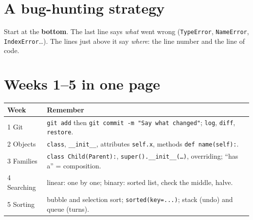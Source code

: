\section{A bug-hunting strategy}
\begin{center}
\end{center}

\begin{tip}
Start at the \textbf{bottom}. The last line says \emph{what} went wrong (\texttt{TypeError}, \texttt{NameError}, \texttt{IndexError}\ldots). The lines just above it say \emph{where}: the line number and the line of code.
\end{tip}

\section{Weeks 1--5 in one page}
\begin{center}
\renewcommand{\arraystretch}{1.25}
\begin{tabular}{@{}p{3cm}p{10.3cm}@{}}
\toprule
\textbf{Week} & \textbf{Remember} \\ \midrule
1 Git & \texttt{git add} then \texttt{git commit -m "Say what changed"}; \texttt{log}, \texttt{diff}, \texttt{restore}. \\
2 Objects & \texttt{class}, \texttt{\_\_init\_\_}, attributes \texttt{self.x}, methods \texttt{def name(self):}. \\
3 Families & \texttt{class Child(Parent):}, \texttt{super().\_\_init\_\_(\ldots)}, overriding; \enquote{has a} = composition. \\
4 Searching & linear: one by one; binary: sorted list, check the middle, halve. \\
5 Sorting & bubble and selection sort; \texttt{sorted(key=...)}; stack (undo) and queue (turns). \\
\bottomrule
\end{tabular}
\end{center}

